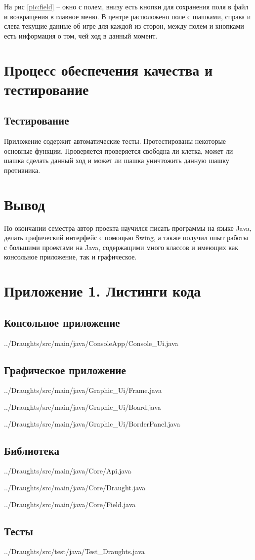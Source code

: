 \documentclass[a4paper]{article}
\begin{document}
На рис \ref{pic:field} – окно с полем, внизу есть кнопки для сохранения поля в файл и возвращения в главное меню. В центре расположено поле с шашками, справа и слева текущие данные об игре для каждой из сторон, между полем и кнопками есть информация о том, чей ход в данный момент.

\section{Процесс обеспечения качества и тестирование}
\subsection{Тестирование}
Приложение содержит автоматические тесты. Протестированы некоторые основные функции. Проверяется проверяется свободна ли клетка, может ли шашка сделать данный ход и может ли шашка уничтожить данную шашку противника.

\section{Вывод}
По окончании семестра автор проекта научился писать программы на языке Java, делать графический интерфейс с помощью Swing, а также получил опыт работы с большими проектами на Java, содержащими много классов и имеющих как консольное приложение, так и графическое.

\section{Приложение 1. Листинги кода}
\subsection{Консольное приложение}

{../Draughts/src/main/java/ConsoleApp/Console_Ui.java}
\newpage

\subsection{Графическое приложение}

{../Draughts/src/main/java/Graphic_Ui/Frame.java}
\newpage


{../Draughts/src/main/java/Graphic_Ui/Board.java}
\newpage


{../Draughts/src/main/java/Graphic_Ui/BorderPanel.java}
\newpage

\subsection{Библиотека}


{../Draughts/src/main/java/Core/Api.java}
\newpage


{../Draughts/src/main/java/Core/Draught.java}
\newpage


{../Draughts/src/main/java/Core/Field.java}
\newpage

\subsection{Тесты}


{../Draughts/src/test/java/Test_Draughts.java}
\newpage
\end{document}
